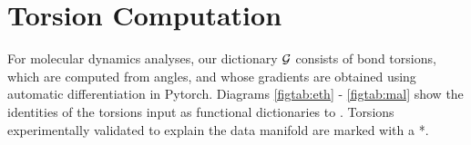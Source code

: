 

\section{Torsion Computation}
\label{app:dictionary-details}

For molecular dynamics analyses, our dictionary ${\cal G}$ consists of bond torsions, which are computed from angles, and whose gradients are obtained using automatic differentiation in Pytorch.
  Diagrams \ref{figtab:eth} -  \ref{figtab:mal} show the identities of the torsions input as functional dictionaries to \ouralg.  Torsions experimentally validated to explain the data manifold are marked with a *.
  
